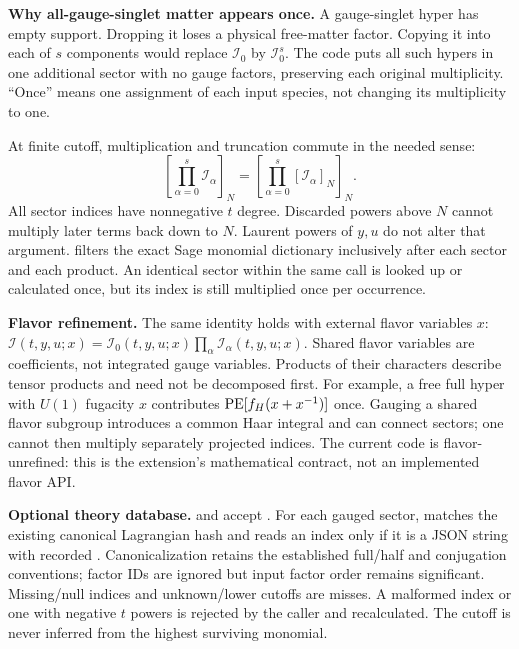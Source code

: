 \textbf{Why all-gauge-singlet matter appears once.} A gauge-singlet hyper
has empty support. Dropping it loses a physical free-matter factor. Copying
it into each of $s$ components would replace $\mathcal I_0$ by
$\mathcal I_0^s$. The code puts all such hypers in one additional sector
with no gauge factors, preserving each original multiplicity. ``Once'' means
one assignment of each input species, not changing its multiplicity to one.

\clearpage
{}
At finite cutoff, multiplication and truncation commute in the needed sense:
\[
 \left[\prod_{\alpha=0}^{s}\mathcal I_\alpha\right]_N
 =\left[\prod_{\alpha=0}^{s}[\mathcal I_\alpha]_N\right]_N.
\]
All sector indices have nonnegative $t$ degree. Discarded powers above $N$
cannot multiply later terms back down to $N$. Laurent powers of $y,u$ do not
alter that argument.  filters the exact Sage monomial
dictionary inclusively after each sector and each product. An identical sector
within the same call is looked up or calculated once, but its index is still
multiplied once per occurrence.

\textbf{Flavor refinement.} The same identity holds with external flavor
variables $x$: $\mathcal I(t,y,u;x)=\mathcal I_0(t,y,u;x)
\prod_\alpha\mathcal I_\alpha(t,y,u;x)$. Shared flavor variables are coefficients,
not integrated gauge variables. Products of their characters describe tensor
products and need not be decomposed first. For example, a free full hyper with
$U(1)$ fugacity $x$ contributes $\operatorname{PE}[f_H(x+x^{-1})]$ once. Gauging a shared
flavor subgroup introduces a common Haar integral and can connect sectors;
one cannot then multiply separately projected indices. The current code is
flavor-unrefined: this is the extension's mathematical contract, not an
implemented flavor API.

\textbf{Optional theory database.}  and
 accept .
For each gauged sector, 
matches the existing canonical Lagrangian hash and reads an index only if it
is a JSON string with recorded .
Canonicalization retains the established full/half and conjugation conventions;
factor IDs are ignored but input factor order remains significant.
Missing/null indices and unknown/lower cutoffs are misses. A malformed index
or one with negative $t$ powers is rejected by the caller and recalculated.
The cutoff is never inferred from the highest surviving monomial.

